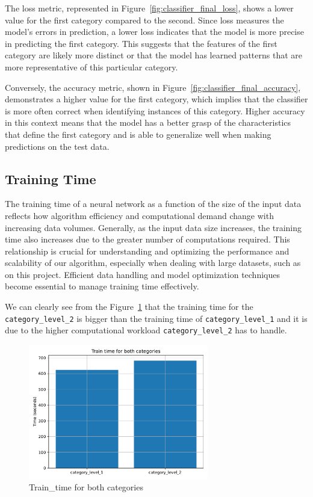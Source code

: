 The loss metric, represented in Figure~\ref{fig:classifier_final_loss}, shows a lower value for the first category compared to the second. Since loss measures the model's errors in prediction, a lower loss indicates that the model is more precise in predicting the first category. This suggests that the features of the first category are likely more distinct or that the model has learned patterns that are more representative of this particular category.

Conversely, the accuracy metric, shown in Figure~\ref{fig:classifier_final_accuracy}, demonstrates a higher value for the first category, which implies that the classifier is more often correct when identifying instances of this category. Higher accuracy in this context means that the model has a better grasp of the characteristics that define the first category and is able to generalize well when making predictions on the test data.

\subsection{Training Time}

The training time of a neural network as a function of the size of the input data reflects how algorithm efficiency and computational demand change with increasing data volumes. Generally, as the input data size increases, the training time also increases due to the greater number of computations required. This relationship is crucial for understanding and optimizing the performance and scalability of our algorithm, especially when dealing with large datasets, such as on this project. Efficient data handling and model optimization techniques become essential to manage training time effectively.

We can clearly see from the Figure~\ref{fig:train_time} that the training time for the \verb*|category_level_2| is bigger than the training time of \verb*|category_level_1| and it is due to the higher computational workload \verb*|category_level_2| has to handle.

\begin{figure}[htpb]
	\centering
	\includegraphics[width=0.7\textwidth]{Images/train_time_categories.pdf}
	\caption{Train\_time for both categories}
	\label{fig:train_time}
\end{figure} 

